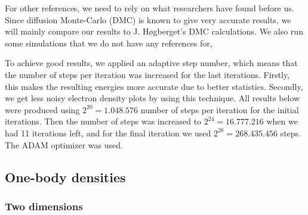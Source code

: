 For other references, we need to rely on what researchers have found before us. Since diffusion Monte-Carlo (DMC) is known to give very accurate results, we will mainly compare our results to J. Høgberget's DMC calculations. \cite{hogberget_quantum_2013} We also run some simulations that we do not have any references for, 

To achieve good results, we applied an adaptive step number, which means that the number of steps per iteration was increased for the last iterations. Firstly, this makes the resulting energies more accurate due to better statistics. Secondly, we get less noisy electron density plots by using this technique. All results below were produced using $2^{20}=1.048.576$ number of steps per iteration for the initial iterations. Then the number of steps was increased to $2^{24}=16.777.216$ when we had 11 iterations left, and for the final iteration we used $2^{28}=268.435.456$ steps. The ADAM optimizer was used.

\subsection{One-body densities}
\subsubsection{Two dimensions}

